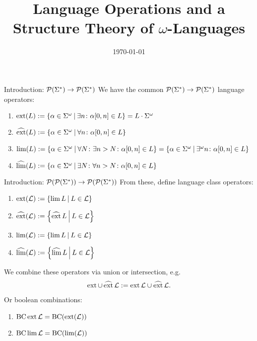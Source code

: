 \documentclass[
	handout,
	notheorems,noamsthm]{beamer}
\title[Kurzform]{Language Operations and a Structure Theory of $\omega$-Languages}
\date{\today}
\begin{document}
\frame{\titlepage}


\begin{frame}[<+->]{Introduction: $\mathcal{P}(\Sigma^*) \rightarrow \mathcal{P}(\Sigma^*)$}
We have the common $\mathcal{P}(\Sigma^*) \rightarrow \mathcal{P}(\Sigma^*)$ language operators:

\begin{enumerate}
\item $\ext(L) := \Set{\alpha \in \Sigma^\omega}{ \exists n \colon \alpha[0,n] \in L} = L \cdot \Sigma^\omega$
\item $\dext(L) := \Set{\alpha \in \Sigma^\omega}{ \forall n \colon \alpha[0,n] \in L}$
\item $\lim(L) := \Set{ \alpha \in \Sigma^\omega }{ \forall N \colon \exists n > N \colon \alpha[0,n] \in L } = \Set{ \alpha \in \Sigma^\omega }{ \exists^\omega n \colon \alpha[0,n] \in L }$
\item $\dlim(L) := \Set{ \alpha \in \Sigma^\omega }{ \exists N \colon \forall n > N \colon \alpha[0,n] \in L }$
\end{enumerate}
\end{frame}

\begin{frame}[<+->]{Introduction: $\mathcal{P}(\mathcal{P}(\Sigma^*)) \rightarrow \mathcal{P}(\mathcal{P}(\Sigma^*))$}
From these, define language class operators:

\begin{enumerate}
\item $\ext(\Lang) := \Set{\lim L}{L \in \Lang}$
\item $\dext(\Lang) := \Set{\dext L}{L \in \Lang}$
\item $\lim(\Lang) := \Set{\lim L}{L \in \Lang}$
\item $\dlim(\Lang) := \Set{\dlim L}{L \in \Lang}$
\end{enumerate}

We combine these operators via union or intersection, e.g.
\[ \operatorname{ext} \cup \operatorname{\widehat{ext}} \mathcal{L} := \operatorname{ext} \mathcal{L} \cup \operatorname{\widehat{ext}} \mathcal{L} . \] 

Or boolean combinations:
\begin{enumerate}
\item $\operatorname{BC} \operatorname{ext} \mathcal{L} = \operatorname{BC} (\operatorname{ext} (\mathcal{L}))$
\item $\operatorname{BC} \lim \mathcal{L} = \operatorname{BC} (\lim (\mathcal{L}))$
\end{enumerate}
\end{frame}
\end{document}
